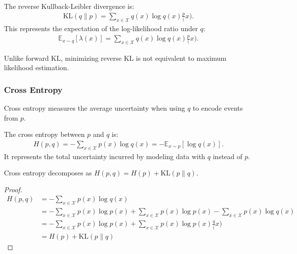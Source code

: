 \begin{definition}
	The \textnormal{\sffamily reverse Kullback-Leibler divergence} is:
	\begin{align}
		\label{eq:reverse-KL}
		\text{KL}(q \| p) = \sum_{x \in \mathcal{X}} q(x) \log{q(x) \frac p(x)}.
	\end{align}
	This represents the expectation of the log-likelihood ratio under $q$:
	\begin{align}
		\mathbb{E}_{x \sim q}[\lambda(x)] = \sum_{x \in \mathcal{X}} q(x)\log {q(x) \frac p(x)}.
	\end{align}
\end{definition}
Unlike forward KL, minimizing reverse KL is not equivalent to maximum likelihood estimation.

\subsubsection{Cross Entropy}
Cross entropy measures the average uncertainty when using $q$ to encode events from $p$.

\begin{definition}
	The \textnormal{\sffamily cross entropy} between $p$ and $q$ is:
	\begin{align}
		H(p, q) = - \sum_{x \in \mathcal{X}} p(x) \log q(x) = -\mathbb{E}_{x \sim p}\left[\log{q(x)}\right].
	\end{align}
	It represents the total uncertainty incurred by modeling data with $q$ instead of $p$.
\end{definition}

\begin{lemma}
	Cross entropy decomposes as $H(p, q) = H(p) + \text{KL}(p \| q)$.
\end{lemma}
\begin{proof}
	\begin{align}
		H(p, q) & = -\sum_{x \in \mathcal{X}} p(x) \log q(x)                                                                                     \\
		        & = -\sum_{x \in \mathcal{X}} p(x) \log p(x) + \sum_{x \in \mathcal{X}} p(x) \log p(x) - \sum_{x \in \mathcal{X}} p(x) \log q(x) \\
		        & = -\sum_{x \in \mathcal{X}} p(x) \log p(x) + \sum_{x \in \mathcal{X}} p(x) \log {p(x) \frac q(x)}                              \\
		        & = H(p) + \text{KL}(p \| q)
	\end{align}
\end{proof}

